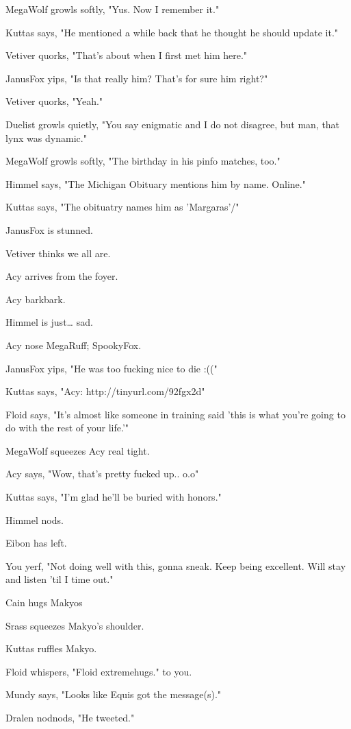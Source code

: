 \begin{hangparas}{2em}{1}
MegaWolf growls softly, "Yus. Now I remember it."

Kuttas says, "He mentioned a while back that he thought he should update it."

Vetiver quorks, "That's about when I first met him here."

JanusFox yips, "Is that really him?  That's for sure him right?"

Vetiver quorks, "Yeah."

Duelist growls quietly, "You say enigmatic and I do not disagree, but man, that lynx was dynamic."

MegaWolf growls softly, "The birthday in his pinfo matches, too."

Himmel says, "The Michigan Obituary mentions him by name. Online."

Kuttas says, "The obituatry names him as 'Margaras'/"

JanusFox is stunned.

Vetiver thinks we all are.

Acy arrives from the foyer.

Acy barkbark.

Himmel is just\ldots{} sad.

Acy nose MegaRuff; SpookyFox.

JanusFox yips, "He was too fucking nice to die :(("

Kuttas says, "Acy: http://tinyurl.com/92fgx2d"

Floid says, "It's almost like someone in training said 'this is what you're going to do with the rest of your life.'"

MegaWolf squeezes Acy real tight.

Acy says, "Wow, that's pretty fucked up.. o.o"

Kuttas says, "I'm glad he'll be buried with honors."

Himmel nods.

Eibon has left.

You yerf, "Not doing well with this, gonna sneak.  Keep being excellent.  Will stay and listen 'til I time out."

Cain hugs Makyos

Srass squeezes Makyo's shoulder.

Kuttas ruffles Makyo.

Floid whispers, "Floid extremehugs." to you.

Mundy says, "Looks like Equis got the message(s)."

Dralen nodnods, "He tweeted."


\end{hangparas}
